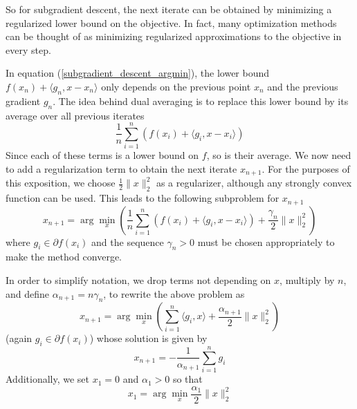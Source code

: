 So for subgradient descent, the next iterate can be obtained by minimizing a regularized lower bound on the objective.
In fact, many optimization methods can be thought of as minimizing regularized approximations to the objective in 
every step.

In equation (\ref{subgradient_descent_argmin}), the lower bound $f(x_n) + \langle g_n, x - x_n\rangle$ only depends on
the previous point $x_n$ and the previous gradient $g_n$. The idea behind dual averaging is to replace this
lower bound by its average over all previous iterates
\begin{equation}
 \frac{1}{n}\displaystyle\sum_{i = 1}^n (f(x_i) + \langle g_i, x - x_i\rangle)
\end{equation}
Since each of these terms is a lower bound on $f$, so is their average. We now need to add a regularization term
to obtain the next iterate $x_{n+1}$. For the purposes of this exposition, we choose $\frac{1}{2}\|x\|^2_2$ as a regularizer,
although any strongly convex function can be used. This leads to the following subproblem for $x_{n+1}$
\begin{equation}
 x_{n+1} = \arg\min_x\left(\frac{1}{n}\displaystyle\sum_{i = 1}^n (f(x_i) + \langle g_i, x - x_i\rangle) + \frac{\gamma_n}{2}\|x\|_2^2\right)
\end{equation}
where $g_i\in \partial f(x_i)$ and the sequence $\gamma_n > 0$ must be chosen appropriately to make the method converge. 

In order to simplify notation, we drop terms not depending on $x$, multiply by $n$, and define $\alpha_{n+1} = n\gamma_n$,
to rewrite the above problem as
\begin{equation}\label{SDA_iteration}
 x_{n+1} = \arg\min_x\left(\displaystyle\sum_{i = 1}^n \langle g_i, x\rangle + \frac{\alpha_{n+1}}{2}\|x\|_2^2\right)
\end{equation}
(again $g_i\in \partial f(x_i)$) whose solution is given by
\begin{equation}
 x_{n+1} = -\frac{1}{\alpha_{n+1}}\displaystyle\sum_{i = 1}^n g_i
\end{equation}
Additionally, we set $x_1 = 0$ and $\alpha_1 > 0$ so that
\begin{equation}
 x_1 = \arg\min_x \frac{\alpha_1}{2}\|x\|_2^2
\end{equation}


